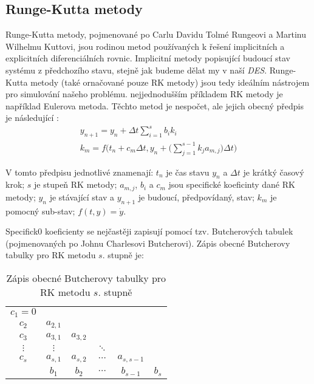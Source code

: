 \documentclass[12pt, a4paper,
 twoside,        %
 openright
]{report}
\begin{document}
\subsection{Runge-Kutta metody}

Runge-Kutta metody, pojmenované po Carlu Davidu Tolmé Rungeovi a Martinu Wilhelmu Kuttovi, jsou rodinou metod používaných k řešení implicitních a explicitních diferenciálních rovnic. Implicitní metody popisující budoucí stav systému z předchozího stavu, stejně jak budeme dělat my v naší \textit{DES}. Runge-Kutta metody (také ornačované pouze RK metody) jsou tedy ideálním nástrojem pro simulování našeho problému. nejjednodušším příkladem RK metody je například Eulerova metoda. Těchto metod je nespočet, ale jejich obecný předpis je následující \cite{RK_def}:
\begin{equation}
    \label{eq:RK_def}
    \begin{gathered}
        y_{n+1} = y_n + \Delta t \sum_{i=1}^{s} b_i k_i \\
        k_m = f \Bigg(t_n + c_m \Delta t, y_n + \Bigg(\sum_{j=1}^{s-1} k_j a_{m,j} \Bigg) \Delta t \Bigg)
    \end{gathered}
\end{equation}

V tomto předpisu jednotlivé znamenají: $t_n$ je čas stavu $y_n$ a $\Delta t$ je krátký časový krok; $s$ je stupeň RK metody; $a_{m,j}$, $b_i$ a $c_m$ jsou specifické koeficinty dané RK metody; $y_n$ je stávající stav a $y_{n+1}$ je budoucí, předpovídaný, stav; $k_m$ je pomocný sub-stav; $f(t,y) = \dot{y}$.

Specifick0 koeficienty se nejčastěji zapisují pomocí tzv. Butcherových tabulek \cite{Butcher_tab_def} (pojmenovaných po Johnu Charlesovi Butcherovi). Zápis obecné Butcherovy tabulky pro RK metodu $s$. stupně je:
\begin{table}[!ht]
    \centering
    \captionsetup{singlelinecheck=off}
    \caption{Zápis obecné Butcherovy tabulky pro RK metodu $s$. stupně}
    \label{tab:Butch_tab}

    \begin{tabularx}{7cm}{c | c c c c c}
        $c_1 = 0$ \\
        $c_2$ & $a_{2, 1}$ \\
        $c_3$ & $a_{3, 1}$ & $a_{3, 2}$ \\
        $\vdots$ & $\vdots$ & & $\ddots$ \\
        $c_s$ & $a_{s, 1}$ & $a_{s, 2}$ & $\cdots$ & $a_{s, s-1}$ \\
        \hline
        & $b_1$ & $b_2$ & $\cdots$ & $b_{s-1}$ & $b_s$ \\
    \end{tabularx}
\end{table}
\end{document}
